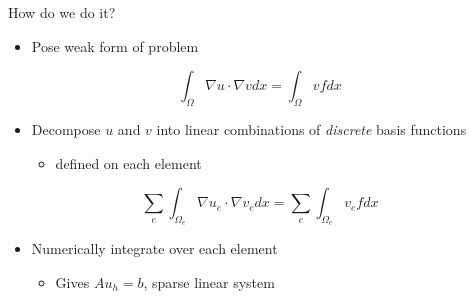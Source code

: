 \documentclass[bigger]{beamer}
\begin{document}
\begin{frame}[label={sec:orgheadline15}]{How do we do it?}
\begin{itemize}
\item Pose weak form of problem
\end{itemize}

\begin{displaymath}
\int_\Omega \nabla u \cdot \nabla v dx = \int_\Omega v f dx
\end{displaymath}

\begin{itemize}
\item Decompose \(u\) and \(v\) into linear combinations of \emph{discrete} basis
functions
\begin{itemize}
\item defined on each element
\end{itemize}
\end{itemize}

\begin{displaymath}
\sum_e \int_{\Omega_e} \nabla u_e \cdot \nabla v_e dx = \sum_e \int_{\Omega_e} v_e f dx
\end{displaymath}

\begin{itemize}
\item Numerically integrate over each element
\begin{itemize}
\item Gives \(A u_h = b\), sparse linear system
\end{itemize}
\end{itemize}
\end{frame}
\end{document}
